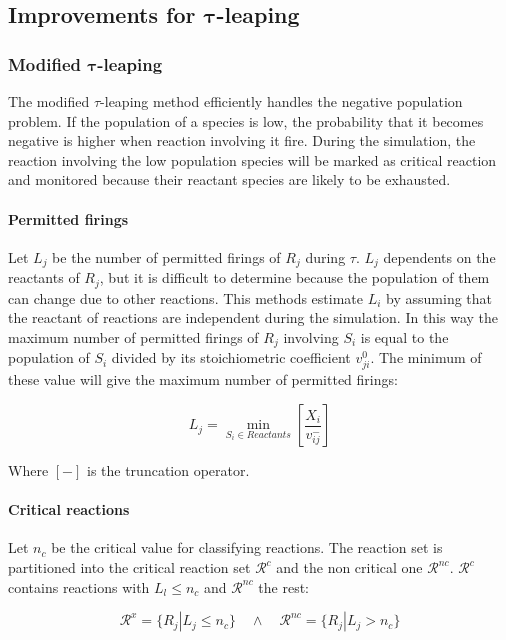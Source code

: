   

  \subsection{Improvements for $\mathbf{\tau}$-leaping}

    \subsubsection{Modified $\mathbf{\tau}$-leaping}
    The modified $\tau$-leaping method efficiently handles the negative population problem.
    If the population of a species is low, the probability that it becomes negative is higher when reaction involving it fire.
    During the simulation, the reaction involving the low population species will be marked as critical reaction and monitored because their reactant species are likely to be exhausted.

      \paragraph{Permitted firings}
      Let $L_j$ be the number of permitted firings of $R_j$ during $\tau$.
      $L_j$ dependents on the reactants of $R_j$, but it is difficult to determine because the population of them can change due to other reactions.
      This methods estimate $L_i$ by assuming that the reactant of reactions are independent during the simulation.
      In this way the maximum number of permitted firings of $R_j$ involving $S_i$ is equal to the population of $S_i$ divided by its stoichiometric coefficient $v_{ji}^0$.
      The minimum of these value will give the maximum number of permitted firings:

      $$L_j = \min\limits_{S_i\in Reactants}\left[\frac{X_i}{v_{ij}^-}\right]$$

      Where $[-]$ is the truncation operator.

      \paragraph{Critical reactions}
      Let $n_c$ be the critical value for classifying reactions.
      The reaction set is partitioned into the critical reaction set $\mathcal{R}^c$ and the non critical one $\mathcal{R}^{nc}$.
      $\mathcal{R}^c$ contains reactions with $L_l\le n_c$ and $\mathcal{R}^{nc}$ the rest:

      $$\mathcal{R}^x = \{R_j|L_j\le n_c\}\quad\land\quad\mathcal{R}^{nc} = \{R_j|L_j>n_c\}$$

